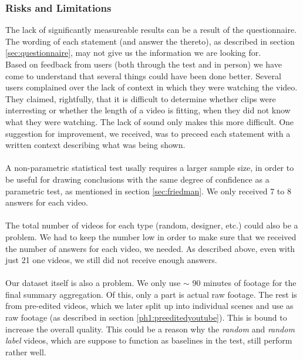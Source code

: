 \subsubsection{Risks and Limitations}
%
The lack of significantly measureable results can be a result of the questionnaire. The wording of each statement (and answer the thereto), as described in section \ref{sec:questionnaire}, may not give us the information we are looking for.\\
Based on feedback from users (both through the test and in person) we have come to understand that several things could have been done better. Several users complained over the lack of context in which they were watching the video. They claimed, rightfully, that it is difficult to determine whether clips were interresting or whether the length of a video is fitting, when they did not know what they were watching. The lack of sound only makes this more difficult. One suggestion for improvement, we received, was to preceed each statement with a written context describing what was being shown.\\
\\
A non-parametric statistical test usally requires a larger sample size, in order to be useful for drawing conclusions with the same degree of confidence as a parametric test, as mentioned in section \ref{sec:friedman}. We only received 7 to 8 answers for each video.\\
\\
The total number of videos for each type (random, designer, etc.) could also be a problem. We had to keep the number low in order to make sure that we received the number of answers for each video, we needed. As described above, even with just 21 one videos, we still did not receive enough answers.\\
\\
Our dataset itself is also a problem. We only use $\sim$ 90 minutes of footage for the final summary aggregation. Of this, only a part is actual raw footage. The rest is from pre-edited videos, which we later split up into individual scenes and use as raw footage (as described in section \ref{ph1:preeditedyoutube}). This is bound to increase the overall quality. This could be a reason why the \textit{random} and \textit{random label} videos, which are suppose to function as baselines in the test, still perform rather well.
%
